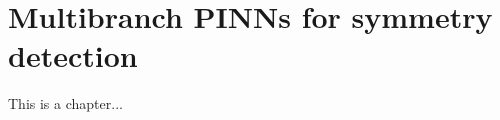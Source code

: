 \chapter{Multibranch PINNs for symmetry detection}
\nopagebreak
\label{chap:chapter_4}
\thispagestyle{empty}

This is a chapter...


\clearpage
